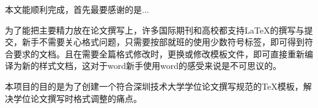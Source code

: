 
\begin{thankscontent}
    本文能顺利完成，首先最要感谢的是...
    
    为了能把主要精力放在论文撰写上，许多国际期刊和高校都支持LaTeX的撰写与提交，新手不需要关心格式问题，只需要按部就班的使用少数符号标签，即可得到符合要求的文档。且在需要全篇格式修改时，更换或修改模板文件，即可直接重新编译为新的样式文档，这对于word新手使用word的感受来说是不可思议的。
    
    本项目的目的是为了创建一个符合深圳技术大学学位论文撰写规范的TeX模板，解决学位论文撰写时格式调整的痛点。
    
    
\end{thankscontent}